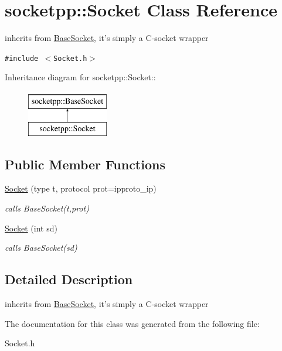 \hypertarget{classsocketpp_1_1Socket}{
\section{socketpp::Socket Class Reference}
\label{classsocketpp_1_1Socket}
}
inherits from \hyperlink{classsocketpp_1_1BaseSocket}{BaseSocket}, it's simply a C-socket wrapper  


{\tt \#include $<$Socket.h$>$}

Inheritance diagram for socketpp::Socket::\begin{figure}[H]
\begin{center}
\leavevmode
\includegraphics[height=2cm]{classsocketpp_1_1Socket}
\end{center}
\end{figure}
\subsection*{Public Member Functions}
\begin{CompactItemize}
\item 
\hypertarget{classsocketpp_1_1Socket_c10e4f533ed78a3d898c1fe0cea09cef}{
\hyperlink{classsocketpp_1_1Socket_c10e4f533ed78a3d898c1fe0cea09cef}{Socket} (type t, protocol prot=ipproto\_\-ip)}
\label{classsocketpp_1_1Socket_c10e4f533ed78a3d898c1fe0cea09cef}

\begin{CompactList}\small\item\em calls BaseSocket(t,prot) \item\end{CompactList}\item 
\hypertarget{classsocketpp_1_1Socket_2ec875f75becab573f7720d50ab13c99}{
\hyperlink{classsocketpp_1_1Socket_2ec875f75becab573f7720d50ab13c99}{Socket} (int sd)}
\label{classsocketpp_1_1Socket_2ec875f75becab573f7720d50ab13c99}

\begin{CompactList}\small\item\em calls BaseSocket(sd) \item\end{CompactList}\end{CompactItemize}


\subsection{Detailed Description}
inherits from \hyperlink{classsocketpp_1_1BaseSocket}{BaseSocket}, it's simply a C-socket wrapper 

The documentation for this class was generated from the following file:\begin{CompactItemize}
\item 
Socket.h\end{CompactItemize}
